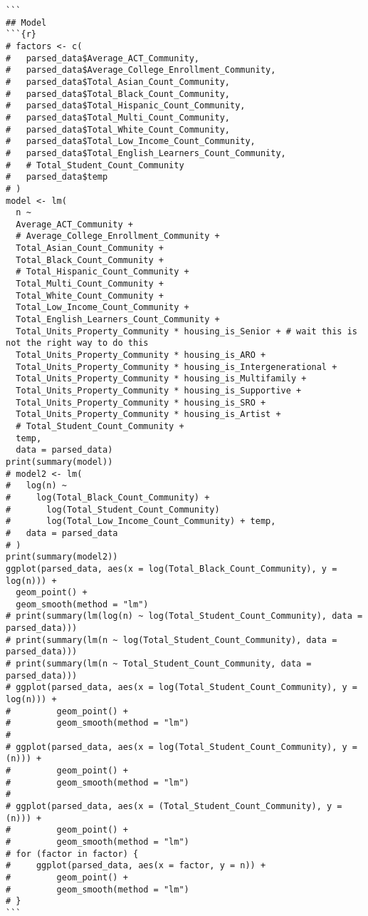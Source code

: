 \documentclass{article}
\begin{document}
\begin{verbatim}
```
## Model
```{r}
# factors <- c(
#   parsed_data$Average_ACT_Community,
#   parsed_data$Average_College_Enrollment_Community,
#   parsed_data$Total_Asian_Count_Community,
#   parsed_data$Total_Black_Count_Community,
#   parsed_data$Total_Hispanic_Count_Community,
#   parsed_data$Total_Multi_Count_Community,
#   parsed_data$Total_White_Count_Community,
#   parsed_data$Total_Low_Income_Count_Community,
#   parsed_data$Total_English_Learners_Count_Community,
#   # Total_Student_Count_Community
#   parsed_data$temp
# )
model <- lm(
  n ~
  Average_ACT_Community +
  # Average_College_Enrollment_Community +
  Total_Asian_Count_Community +
  Total_Black_Count_Community +
  # Total_Hispanic_Count_Community +
  Total_Multi_Count_Community +
  Total_White_Count_Community +
  Total_Low_Income_Count_Community +
  Total_English_Learners_Count_Community +
  Total_Units_Property_Community * housing_is_Senior + # wait this is not the right way to do this
  Total_Units_Property_Community * housing_is_ARO +
  Total_Units_Property_Community * housing_is_Intergenerational +
  Total_Units_Property_Community * housing_is_Multifamily +
  Total_Units_Property_Community * housing_is_Supportive +
  Total_Units_Property_Community * housing_is_SRO +
  Total_Units_Property_Community * housing_is_Artist +
  # Total_Student_Count_Community +
  temp,
  data = parsed_data)
print(summary(model))
# model2 <- lm(
#   log(n) ~
#     log(Total_Black_Count_Community) +
#       log(Total_Student_Count_Community)
#       log(Total_Low_Income_Count_Community) + temp,
#   data = parsed_data
# )
print(summary(model2))
ggplot(parsed_data, aes(x = log(Total_Black_Count_Community), y = log(n))) +
  geom_point() +
  geom_smooth(method = "lm")
# print(summary(lm(log(n) ~ log(Total_Student_Count_Community), data = parsed_data)))
# print(summary(lm(n ~ log(Total_Student_Count_Community), data = parsed_data)))
# print(summary(lm(n ~ Total_Student_Count_Community, data = parsed_data)))
# ggplot(parsed_data, aes(x = log(Total_Student_Count_Community), y = log(n))) +
#         geom_point() +
#         geom_smooth(method = "lm")
#
# ggplot(parsed_data, aes(x = log(Total_Student_Count_Community), y = (n))) +
#         geom_point() +
#         geom_smooth(method = "lm")
#
# ggplot(parsed_data, aes(x = (Total_Student_Count_Community), y = (n))) +
#         geom_point() +
#         geom_smooth(method = "lm")
# for (factor in factor) {
#     ggplot(parsed_data, aes(x = factor, y = n)) +
#         geom_point() +
#         geom_smooth(method = "lm")
# }
```
\end{verbatim}
\end{document}
